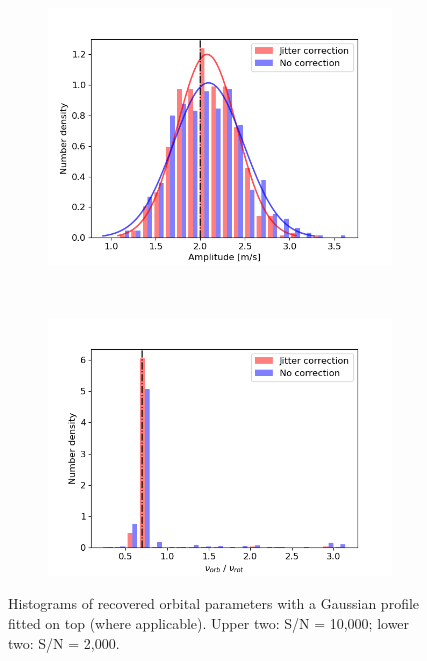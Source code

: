 \begin{figure}[tbp]
\begin{subfigure}[b]{0.49\textwidth}
    \end{subfigure}	
    ~
    \begin{subfigure}[b]{0.49\textwidth}
        \includegraphics[width=\textwidth]{./Figures/Methods/Histogram_new1_p2_sn2000.png}
    \end{subfigure}
	~
    \begin{subfigure}[b]{0.49\textwidth}
        \includegraphics[width=\textwidth]{./Figures/Methods/Histogram_new2_p2_sn2000.png}
    \end{subfigure}	
    \caption[Histograms of recovered orbital parameters ($A = 2$~m/s)]
    {Histograms of recovered orbital parameters with a Gaussian profile fitted on top (where applicable). Upper two: S/N = 10,000; lower two: S/N = 2,000.}
\label{fig:Histogram}
\end{figure}    


